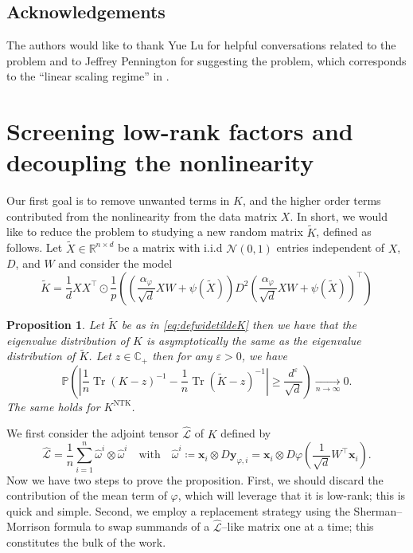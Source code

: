 \documentclass[letterpaper, 10pt, dvipsnames]{article}
\numberwithin{equation}{section}
\DeclareMathOperator{\Tr}{Tr}
\newcommand{\tr}{\Tr}
\newcommand{\Rbb}{\mathbb{R}}
\newcommand{\C}{\mathbb{C}}
\newcommand{\x}{\mathbf{x}}
\newcommand{\y}{\mathbf{y}}
\renewcommand{\phi}{\varphi}
\renewcommand{\P}{\mathds{P}}
\newtheorem{prop}[ccounter]{Proposition}
\theoremstyle{definition}
\begin{document}
\subsection*{Acknowledgements}

The authors would like to thank Yue Lu for helpful conversations related to the problem and to Jeffrey Pennington for suggesting the problem, which corresponds to the ``linear scaling regime'' in \cite{adlam2020neural}.




\section{Screening low-rank factors and decoupling the nonlinearity}\label{sec:nonlinearity}
Our first goal is to remove unwanted terms in $K$, and the higher order terms contributed from the nonlinearity from the data matrix $X$.
In short, we would like to reduce the problem to studying a new random matrix $\widetilde{K}$, defined as follows. Let $\widetilde{X}\in\Rbb^{n\times d}$ be a matrix with i.i.d $\mathcal{N}(0,1)$ entries independent of $X$, $D$, and $W$ and consider the model 
  \begin{equation}\label{eq:defwidetildeK}
        \widetilde{K} =
        \frac{1}{d}XX^\top \odot 
\frac{1}{p}
\left(
  \left(\frac{\alpha_\phi}{\sqrt{d}} XW + \psi(\widetilde{X})\right)
  D^2
  \left(\frac{\alpha_\phi}{\sqrt{d}} XW + \psi(\widetilde{X})\right)^{\top}
  \right)
  \end{equation}

\begin{prop}\label{prop:replace}
    Let $\widetilde{K}$ be as in \eqref{eq:defwidetildeK} then we have that the eigenvalue distribution of $K$ is asymptotically the same as the eigenvalue distribution of $\widetilde{K}$.
    Let $z\in\C_+$ then for any $\varepsilon>0$, we have 
    \[
    \P\left(
      \left\vert 
        \frac{1}{n}\tr (K-z)^{-1}-\frac{1}{n}\tr(\widetilde{K}-z)^{-1}
      \right\vert
      \geqslant \frac{d^\varepsilon}{\sqrt{d}}
      \right)
    \xrightarrow[n\to\infty]{}0.    
    \]
    The same holds for $K^{\mathrm{NTK}}$.
\end{prop}
We first consider the adjoint tensor $\widehat{\mathcal{L}}$ of $K$ defined by
\[
\widehat{\mathcal{L}} = \frac{1}{n} \sum_{i=1}^n \widehat{\omega}^i\otimes\widehat{\omega}^i
\quad\text{with}\quad 
\widehat{\omega}^i \coloneqq \x_i\otimes D\y_{\phi,i} = \x_i\otimes D\phi\left(\frac{1}{\sqrt{d}}W^\top \x_i\right).
\]
Now we have two steps to prove the proposition.  First, we should discard the contribution of the mean term of $\varphi$, which will leverage that it is low-rank; this is quick and simple.  Second, we employ a replacement strategy using the Sherman--Morrison formula to swap summands of a $\widehat{\mathcal{L}}$--like matrix one at a time; this constitutes the bulk of the work.
\end{document}
